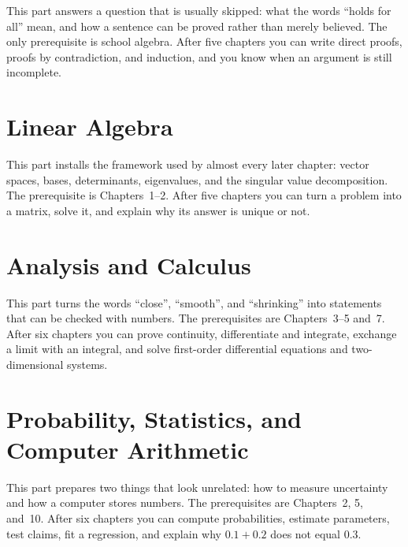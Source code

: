 This part answers a question that is usually skipped: what the words ``holds for all''
mean, and how a sentence can be proved rather than merely believed. The only prerequisite
is school algebra. After five chapters you can write direct proofs, proofs by contradiction,
and induction, and you know when an argument is still incomplete.






\part{Linear Algebra}

This part installs the framework used by almost every later chapter: vector spaces, bases,
determinants, eigenvalues, and the singular value decomposition. The prerequisite is
Chapters~1--2. After five chapters you can turn a problem into a matrix, solve it, and
explain why its answer is unique or not.






\part{Analysis and Calculus}

This part turns the words ``close'', ``smooth'', and ``shrinking'' into statements that can
be checked with numbers. The prerequisites are Chapters~3--5 and~7. After six chapters you
can prove continuity, differentiate and integrate, exchange a limit with an integral, and
solve first-order differential equations and two-dimensional systems.







\part{Probability, Statistics, and Computer Arithmetic}

This part prepares two things that look unrelated: how to measure uncertainty and how a
computer stores numbers. The prerequisites are Chapters~2, 5, and~10. After six chapters you
can compute probabilities, estimate parameters, test claims, fit a regression, and explain
why $0.1+0.2$ does not equal $0.3$.







